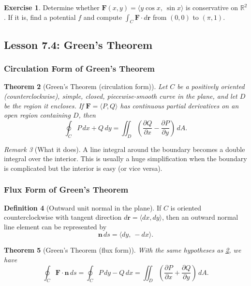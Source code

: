 \documentclass[12pt]{article}
\numberwithin{equation}{section}
\newcommand{\RR}{\mathbb{R}}
\newcommand{\vect}[1]{\boldsymbol{#1}}   %
\theoremstyle{plain}
\newtheorem{theorem}{Theorem}[section]
\theoremstyle{definition}
\newtheorem{definition}[theorem]{Definition}
\newtheorem{exercise}[theorem]{Exercise}
\theoremstyle{remark}
\newtheorem{remark}[theorem]{Remark}
\begin{document}
\begin{exercise}
Determine whether $\vect F(x,y)=\langle y\cos x,\ \sin x\rangle$ is conservative on $\RR^2$.
If it is, find a potential $f$ and compute $\int_C \vect F\cdot d\vect r$ from $(0,0)$ to $(\pi,1)$.
\end{exercise}

\subsection{Lesson 7.4: Green's Theorem}

\subsubsection{Circulation Form of Green's Theorem}

\begin{theorem}[Green's Theorem (circulation form)]\label{thm:green}
Let $C$ be a positively oriented (counterclockwise), simple, closed, piecewise-smooth curve in the plane, and let $D$ be the region it encloses.  
If $\vect F=\langle P,Q\rangle$ has continuous partial derivatives on an open region containing $D$, then
\begin{equation}\label{eq:green-circ}
\oint_C P\,dx+Q\,dy
=
\iint_D \left(\frac{\partial Q}{\partial x}-\frac{\partial P}{\partial y}\right)\,dA.
\end{equation}
\end{theorem}

\begin{remark}[What it does]
A line integral around the boundary becomes a double integral over the interior.  
This is usually a huge simplification when the boundary is complicated but the interior is easy (or vice versa).
\end{remark}

\subsubsection{Flux Form of Green's Theorem}

\begin{definition}[Outward unit normal in the plane]
If $C$ is oriented counterclockwise with tangent direction $d\vect r=\langle dx,dy\rangle$, then an outward normal line element can be represented by
\[
\vect n\,ds=\langle dy,\ -dx\rangle.
\]
\end{definition}

\begin{theorem}[Green's Theorem (flux form)]\label{thm:green-flux}
With the same hypotheses as \cref{thm:green}, we have
\begin{equation}\label{eq:green-flux}
\oint_C \vect F\cdot \vect n\,ds
=
\oint_C P\,dy - Q\,dx
=
\iint_D \left(\frac{\partial P}{\partial x}+\frac{\partial Q}{\partial y}\right)\,dA.
\end{equation}
\end{theorem}
\end{document}
